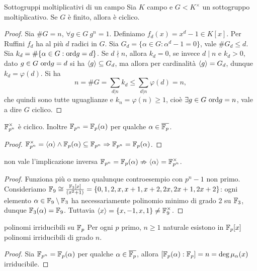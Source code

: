 \begin{theorem}{Sottogruppi moltiplicativi di un campo}
    Sia $K$ campo e $G < K^\times$ un sottogruppo moltiplicativo. Se $G$ è finito, allora è ciclico.
\end{theorem}
\begin{proof}
    Sia $\#G = n$, $\forall g \in G \ g^n = 1$. Definiamo $f_d(x) = x^d - 1 \in K[x]$. Per Ruffini $f_d$ ha al più $d$ radici in $G$. Sia $G_d = \{ \alpha \in G : \alpha^d - 1 = 0 \}$, vale $\#G_d \le d$. Sia $k_d = \#\{ \alpha \in G : \text{ord} g = d \}$. Se $d \nmid n$, allora $k_d = 0$, se invece $d \mid n$ e $k_d > 0$, dato $g \in G \ \text{ord} g = d$ si ha $\langle g \rangle \subseteq G_d$, ma allora per cardinalità $\langle g \rangle = G_d$, dunque $k_d = \varphi(d)$. Si ha
    \[
        n = \#G = \sum_{d | n} k_d \le \sum_{d | n} \varphi(d) = n,
    \]
    che quindi sono tutte uguaglianze e $k_n = \varphi(n) \ge 1$, cioè $\exists g \in G \ \text{ord} g = n$, vale a dire $G$ ciclico.
\end{proof}
\begin{corollary2}
    $\mathbb{F}_{p^n}^\times$ è ciclico. Inoltre $\mathbb{F}_{p^n} = \mathbb{F}_p(\alpha)$ per qualche $\alpha \in \overline{\mathbb{F}_p}$.
\end{corollary2}
\begin{proof}
    $\mathbb{F}_{p^n}^\times = \langle \alpha \rangle \land \mathbb{F}_p(\alpha) \subseteq \mathbb{F}_{p^n} \Rightarrow \mathbb{F}_{p^n} = \mathbb{F}_p(\alpha)$.
\end{proof}
\begin{observation}{non vale l'implicazione inversa}
    $\mathbb{F}_{p^n} = \mathbb{F}_p(\alpha) \nRightarrow \langle \alpha \rangle = \mathbb{F}_{p^n}^\times$.
\end{observation}
\begin{proof}
    Funziona più o meno qualunque controesempio con $p^n - 1$ non primo. Consideriamo $\mathbb{F}_9 \cong \frac{\mathbb{F}_3[x]}{(x^2 + 1)} = \{ 0, 1, 2, x, x+1, x+2, 2x, 2x+1, 2x+2 \}$: ogni elemento $\alpha \in \mathbb{F}_9 \setminus \mathbb{F}_3$ ha necessariamente polinomio minimo di grado 2 su $\mathbb{F}_3$, dunque $\mathbb{F}_3(\alpha) = \mathbb{F}_9$. Tuttavia $\langle x \rangle = \{x, -1, x, 1\} \neq \mathbb{F}_9^\times$.
\end{proof}
\begin{corollary}{polinomi irriducibili su $\mathbb{F}_p$}
    Per ogni $p$ primo, $n \ge 1$ naturale esistono in $\mathbb{F}_p[x]$ polinomi irriducibili di grado $n$.
\end{corollary}
\begin{proof}
    Sia $\mathbb{F}_{p^n} = \mathbb{F}_p(\alpha)$ per qualche $\alpha \in \overline{\mathbb{F}_p}$, allora $[\mathbb{F}_p(\alpha) : \mathbb{F}_p] = n = \deg \mu_\alpha(x)$ irriducibile.
\end{proof}
